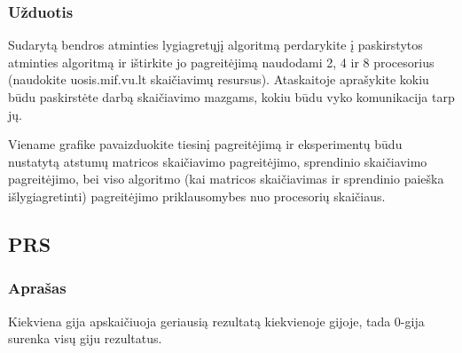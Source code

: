 \documentclass[a4paper,10pt]{article}
\begin{document}
\subsubsection{Užduotis}
Sudarytą bendros atminties lygiagretųjį algoritmą perdarykite į paskirstytos atminties algoritmą ir ištirkite jo pagreitėjimą naudodami 2, 4 ir 8 procesorius (naudokite uosis.mif.vu.lt skaičiavimų resursus). Ataskaitoje aprašykite kokiu būdu paskirstėte darbą skaičiavimo mazgams, kokiu būdu vyko komunikacija tarp jų.

Viename grafike pavaizduokite tiesinį pagreitėjimą ir eksperimentų būdu nustatytą atstumų matricos skaičiavimo pagreitėjimo, sprendinio skaičiavimo pagreitėjimo, bei viso algoritmo (kai matricos skaičiavimas ir sprendinio paieška išlygiagretinti) pagreitėjimo priklausomybes nuo procesorių skaičiaus.
\newpage
\subsection{PRS}
\subsubsection{Aprašas}
Kiekviena gija apskaičiuoja geriausią rezultatą kiekvienoje gijoje, tada 0-gija surenka visų giju rezultatus.
\end{document}

